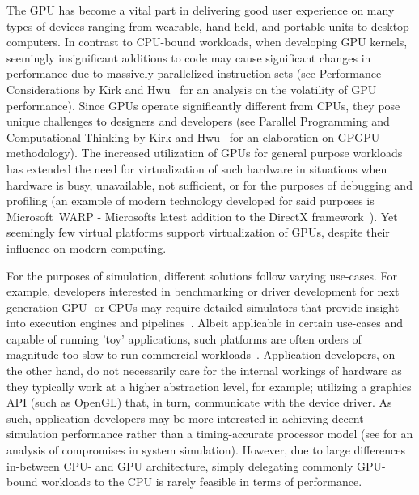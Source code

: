 The GPU has become a vital part in delivering good user experience on many types of devices ranging from wearable, hand held, and portable units to desktop computers.
In contrast to CPU-bound workloads, when developing GPU kernels, seemingly insignificant additions to code may cause significant changes in performance due to massively parallelized instruction sets (see Performance Considerations by Kirk and Hwu~ for an analysis on the volatility of GPU performance).
Since GPUs operate significantly different from CPUs, they pose unique challenges to designers and developers (see Parallel Programming and Computational Thinking by Kirk and Hwu~ for an elaboration on GPGPU methodology).
The increased utilization of GPUs for general purpose workloads has extended the need for virtualization of such hardware in situations when hardware is busy, unavailable, not sufficient, or for the purposes of debugging and profiling (an example of modern technology developed for said purposes is Microsoft~WARP - Microsofts latest addition to the DirectX framework~).
Yet seemingly few virtual platforms support virtualization of GPUs, despite their influence on modern computing.

For the purposes of simulation, different solutions follow varying use-cases. For example, developers interested in benchmarking or driver development for next generation GPU- or CPUs may require detailed simulators that provide insight into execution engines and pipelines~.
Albeit applicable in certain use-cases and capable of running 'toy' applications, such platforms are often orders of magnitude too slow to run commercial workloads~.
Application developers, on the other hand, do not necessarily care for the internal workings of hardware as they typically work at a higher abstraction level, for example; utilizing a graphics API (such as OpenGL) that, in turn, communicate with the device driver.
As such, application developers may be more interested in achieving decent simulation performance rather than a timing-accurate processor model (see  for an analysis of compromises in system simulation).
However, due to large differences in-between CPU- and GPU architecture, simply delegating commonly GPU-bound workloads to the CPU is rarely feasible in terms of performance.

